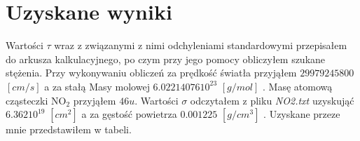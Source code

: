 \documentclass[10pt,a4paper]{article}
\begin{document}
\section{Uzyskane wyniki}
Wartości $\tau$ wraz z związanymi z nimi odchyleniami standardowymi przepisałem do arkusza kalkulacyjnego, po czym przy jego pomocy obliczyłem szukane stężenia. Przy wykonywaniu obliczeń za prędkość światła przyjąłem $29979245800$ $[cm/s]$ \cite{c}  a za stałą Masy molowej $6.02214076 10^{23}$ $[g/mol]$ \cite{c}  . Masę atomową cząsteczki $\text{NO}_{\text{2}}$ przyjąłem $46u$. Wartości $\sigma$ odczytałem z pliku \textit{NO2.txt} uzyskująć $6.362 10^{19}$ $[cm^2]$ a za gęstość powietrza $0.001225$ $[g/cm^3]$ \cite{air}. Uzyskane przeze mnie przedstawiłem w tabeli.


\begin{table}[h]
    \caption{uzyskane wyniki}
    \label{tab:my-table}
\end{table}
\end{document}

